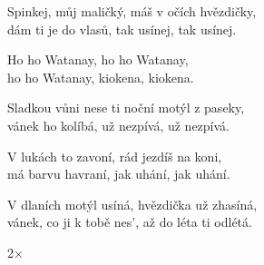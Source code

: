 
\ve{}
Spinkej, můj maličký, máš v očích hvězdičky,\\
dám ti je do vlasů, tak usínej, tak usínej.

\cho{}
Ho ho Watanay, ho ho Watanay,\\
ho ho Watanay, kiokena, kiokena.

\ve{}
Sladkou vůni nese ti noční motýl z paseky,\\
vánek ho kolíbá, už nezpívá, už nezpívá.

\cho{}

\ve{}
V lukách to zavoní, rád jezdíš na koni,\\
má barvu havraní, jak uhání, jak uhání.

\cho{}

\ve{}
V dlaních motýl usíná, hvězdička už zhasíná,\\
vánek, co ji k tobě nes', až do léta ti odlétá.

\cho{}2×

\esong